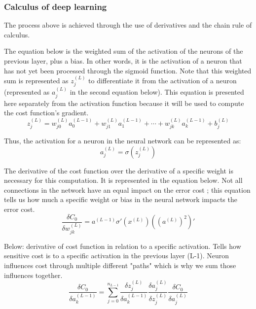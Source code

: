 \documentclass[12pt,a4paper,notitlepage]{article}
\begin{document}
\subsubsection{Calculus of deep learning}
The process above is achieved through the use of derivatives and the chain rule of calculus.

The equation below is the weighted sum of the activation of the neurons of the previous layer, plus a bias. In other words, it is the activation of a neuron that has not yet been processed through the sigmoid function. Note that this weighted sum is represented as \(z_j^{(L)}\) to differentiate it from the activation of a neuron (represented as \(a_j^{(L)}\) in the second equation below). This equation is presented here separately from the activation function because it will be used to compute the cost function's gradient.
\begin{displaymath}
	z_j^{(L)} = w_{j0}^{(L)}a_0^{(L-1)} + w_{j1}^{(L)}a_1^{(L-1)} + \cdots + w_{jk}^{(L)}a_k^{(L-1)} + b_j^{(L)}
\end{displaymath}

Thus, the activation for a neuron in the neural network can be represented as:
\begin{displaymath}
	a_j^{(L)} = \sigma\left(z_j^{(L)}\right)
\end{displaymath}

The derivative of the cost function over the derivative of a specific weight is necessary for this computation. It is represented in the equation below. Not all connections in the network have an equal impact on the error cost ; this equation tells us how much a specific weight or bias in the neural network impacts the error cost.
\begin{displaymath}
	\frac{\delta C_0}{\delta w_{jk}^{(L)}} = a^{(L-1)} \sigma\prime(x^{(L)})((a^{(L)})^2)\prime
\end{displaymath}

Below: derivative of cost function in relation to a specific activation. Tells how sensitive cost is to a specific activation in the previous layer (L-1). Neuron influences cost through multiple different "paths" which is why we sum those influences together.
\begin{displaymath}
	\frac{\delta C_0}{\delta a_{k}^{(L-1)}} = 
	\sum_{j=0}^{n_{L-1}}
	\frac{\delta z_j^{(L)}}{\delta a_{k}^{(L-1)}}
	\frac{\delta a_j^{(L)}}{\delta z_j^{(L)}}
	\frac{\delta C_0}{\delta a_j^{(L)}}
\end{displaymath}
\end{document}
